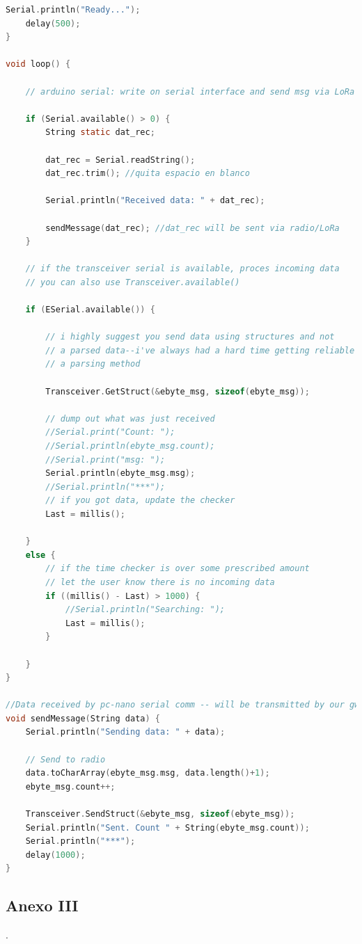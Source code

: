 \documentclass[12pt]{article}
\begin{document}
\begin{lstlisting}[language=C]
	Serial.println("Ready...");
	delay(500);
}

void loop() {
	
	// arduino serial: write on serial interface and send msg via LoRa to refugio station
	
	if (Serial.available() > 0) {
		String static dat_rec;
		
		dat_rec = Serial.readString();
		dat_rec.trim(); //quita espacio en blanco
		
		Serial.println("Received data: " + dat_rec);
		
		sendMessage(dat_rec); //dat_rec will be sent via radio/LoRa
	}
	
	// if the transceiver serial is available, proces incoming data
	// you can also use Transceiver.available()
	
	if (ESerial.available()) {
		
		// i highly suggest you send data using structures and not
		// a parsed data--i've always had a hard time getting reliable data using
		// a parsing method
		
		Transceiver.GetStruct(&ebyte_msg, sizeof(ebyte_msg));
		
		// dump out what was just received
		//Serial.print("Count: "); 
		//Serial.println(ebyte_msg.count);
		//Serial.print("msg: "); 
		Serial.println(ebyte_msg.msg);
		//Serial.println("***");
		// if you got data, update the checker
		Last = millis();
		
	}
	else {
		// if the time checker is over some prescribed amount
		// let the user know there is no incoming data
		if ((millis() - Last) > 1000) {
			//Serial.println("Searching: ");
			Last = millis();
		}
		
	}
}

//Data received by pc-nano serial comm -- will be transmitted by our gw LoRa transceiver
void sendMessage(String data) {
	Serial.println("Sending data: " + data);
	
	// Send to radio
	data.toCharArray(ebyte_msg.msg, data.length()+1);
	ebyte_msg.count++; 
	
	Transceiver.SendStruct(&ebyte_msg, sizeof(ebyte_msg));
	Serial.println("Sent. Count " + String(ebyte_msg.count));
	Serial.println("***");
	delay(1000);
}
	\end{lstlisting}

	\pagebreak
	
	\subsection*{Anexo III}
	\label{subsection: presupuesto}
	
	. \\
	
	\pagebreak
	
\end{document}
